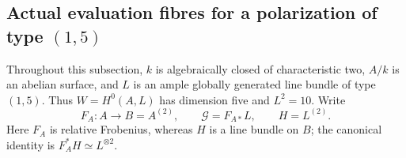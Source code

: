 \subsection{Actual evaluation fibres for a polarization of type \((1,5)\)}

Throughout this subsection, \(k\) is algebraically closed of
characteristic two, \(A/k\) is an abelian surface, and \(L\) is
an ample globally generated line bundle of type \((1,5)\).
Thus \(W=H^0(A,L)\) has dimension five and \(L^2=10\).
Write
\[
 F_A:A\longrightarrow B=A^{(2)},\qquad
 \mathcal G=F_{A*}L,\qquad H=L^{(2)}.
 \tag{EF5.1}
\]
Here \(F_A\) is relative Frobenius, whereas \(H\) is a line
bundle on \(B\); the canonical identity is
\(F_A^*H\simeq L^{\otimes2}\).

